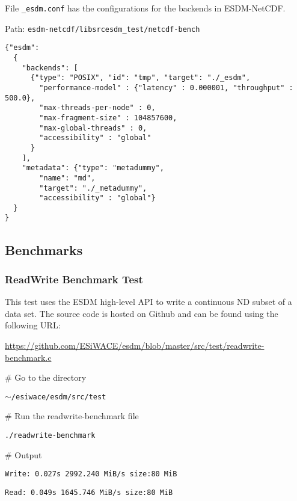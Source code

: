 File \texttt{\_esdm.conf} has the configurations for the backends in ESDM-NetCDF.

\begin{framed}

Path: {\texttt{esdm-netcdf/libsrcesdm\_test/netcdf-bench}}

\begin{verbatim}
{"esdm":
  {
    "backends": [
      {"type": "POSIX", "id": "tmp", "target": "./_esdm",
        "performance-model" : {"latency" : 0.000001, "throughput" : 500.0},
        "max-threads-per-node" : 0,
        "max-fragment-size" : 104857600,
        "max-global-threads" : 0,
        "accessibility" : "global"
      }
    ],
    "metadata": {"type": "metadummy",
        "name": "md",
        "target": "./_metadummy",
        "accessibility" : "global"}
  }
}
\end{verbatim}

\end{framed}

\subsection{Benchmarks}
\label{doc:bench}

\subsubsection{ReadWrite Benchmark Test}
\label{doc:rw-bench}

\tab
This test uses the ESDM high-level API to write a continuous ND subset of a data set. The source code is hosted on Github and can be found using the following URL:

\begin{center}
\url{https://github.com/ESiWACE/esdm/blob/master/src/test/readwrite-benchmark.c}
\end{center}

\tab

\begin{framed}

\# Go to the directory

\texttt{$\sim$/esiwace/esdm/src/test}

\# Run the readwrite-benchmark file

\texttt{./readwrite-benchmark}

\end{framed}

\begin{framed}

\# Output

\texttt{Write: 0.027s 2992.240 MiB/s size:80 MiB}

\texttt{Read: 0.049s 1645.746 MiB/s size:80 MiB}

\end{framed}


